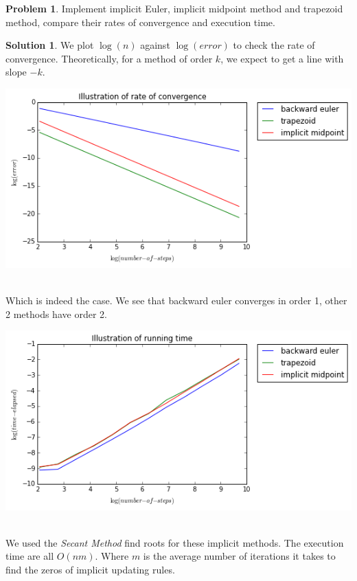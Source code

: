 \documentclass[a4paper, 10pt]{article}
\theoremstyle{definition}
\newtheorem{problem}{Problem}
\theoremstyle{hSol}
\newtheorem*{solution}{Solution}
\begin{document}
\begin{problem} Implement implicit Euler, implicit midpoint method and trapezoid method, compare their rates of convergence and execution time. 

\end{problem}
\begin{solution} We plot $\log(n)$ against $\log(error)$ to check the rate of convergence. Theoretically, for a method of order $k$, we expect to get a line with slope $-k$.

\begin{center}
\includegraphics[scale=0.7]{hw3_p2.png}
\end{center}

~\\
Which is indeed the case. We see that backward euler converges in order 1, other 2 methods have order 2.

\begin{center}
\includegraphics[scale=0.7]{hw3_p3.png}
\end{center}

~\\
We used the \emph{Secant Method} find roots for these implicit methods. The execution time are all $O(nm)$. Where $m$ is the average number of iterations it takes to find the zeros of implicit updating rules.


\end{solution}
\end{document}
